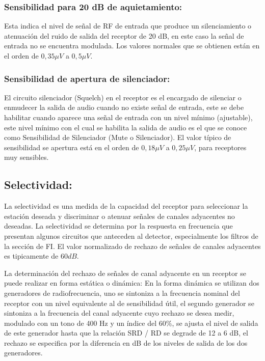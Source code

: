 \documentclass[letterpaper,11pt,spanish]{sphinxmanual}
\let\sphinxpxdimen\pdfpxdimen\else\newdimen\sphinxpxdimen
\begin{document}
\subsubsection{Sensibilidad para 20 dB de aquietamiento:}
\label{\detokenize{introduccion/sistemas:Sensibilidad-para-20-dB-de-aquietamiento:}}
Esta indica el nivel de señal de RF de entrada que produce un silenciamiento o atenuación del ruido de salida del receptor de 20 dB, en este caso la señal de entrada no se encuentra modulada. Los valores normales que se obtienen están en el orden de \(0,35 \mu V\) a \(0,5 \mu V\).


\subsubsection{Sensibilidad de apertura de silenciador:}
\label{\detokenize{introduccion/sistemas:Sensibilidad-de-apertura-de-silenciador:}}
El circuito silenciador (Squelch) en el receptor es el encargado de silenciar o enmudecer la salida de audio cuando no existe señal de entrada, este se debe habilitar cuando aparece una señal de entrada con un nivel mínimo (ajustable), este nivel mínimo con el cual se habilita la salida de audio es el que se conoce como Sensibilidad de Silenciador (Mute o Silenciador). El valor típico de sensibilidad se apertura está en el orden de \(0,18 \mu V\) a \(0,25 \mu V\), para receptores muy
sensibles.


\subsection{Selectividad:}
\label{\detokenize{introduccion/sistemas:Selectividad:}}
La selectividad es una medida de la capacidad del receptor para seleccionar la estación deseada y discriminar o atenuar señales de canales adyacentes no deseadas. La selectividad se determina por la respuesta en frecuencia que presentan algunos circuitos que anteceden al detector, especialmente los filtros de la sección de FI. El valor normalizado de rechazo de señales de canales adyacentes es tipicamente de \(60 dB\).

\sphinxincludegraphics[width=1300\sphinxpxdimen,height=875\sphinxpxdimen]{{selectividad}.png}

La determinación del rechazo de señales de canal adyacente en un receptor se puede realizar en forma estática o dinámica: En la forma dinámica se utilizan dos generadores de radiofrecuencia, uno se sintoniza a la frecuencia nominal del receptor con un nivel equivalente al de sensibilidad útil, el segundo generador se sintoniza a la frecuencia del canal adyacente cuyo rechazo se desea medir, modulado con un tono de 400 Hz y un índice del \(60\%\), se ajusta el nivel de salida de este
generador hasta que la relación SRD / RD se degrade de 12 a 6 dB, el rechazo se especifica por la diferencia en dB de los niveles de salida de los dos generadores.
\end{document}
